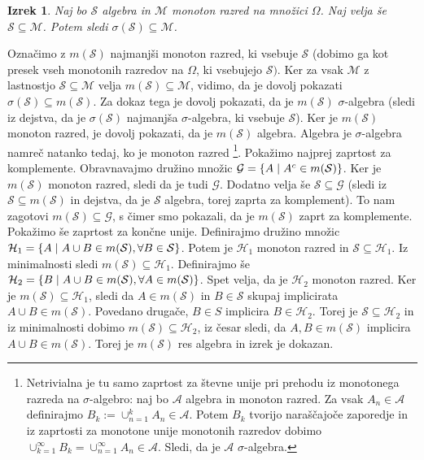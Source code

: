 \documentclass[12pt,a4paper]{amsart}
\theoremstyle{definition} %
\theoremstyle{plain} %
\newtheorem{izrek}[definicija]{Izrek}
\begin{document}
\begin{izrek} Naj bo $\mathcal{S}$ algebra in $\mathcal{M}$ monoton razred na množici $\Omega$. Naj velja še $\mathcal{S} \subseteq \mathcal{M}$. Potem sledi $\sigma{(\mathcal{S})} \subseteq \mathcal{M}$.
\end{izrek}
\proof
 Označimo z $m(\mathcal{S})$ najmanjši monoton razred, ki vsebuje $\mathcal{S}$ (dobimo ga kot presek vseh monotonih razredov na $\Omega$, ki vsebujejo $\mathcal{S}).$ Ker za vsak $\mathcal{M}$ z lastnostjo $\mathcal{S} \subseteq \mathcal{M}$ velja $m(\mathcal{S}) \subseteq \mathcal{M}$, vidimo, da je dovolj pokazati $\sigma(\mathcal{S}) \subseteq m(\mathcal{S})$. Za dokaz tega je dovolj pokazati, da je $m(\mathcal{S}) $ $\sigma$-algebra (sledi iz dejstva, da je $\sigma(\mathcal{S})$ najmanjša $\sigma$-algebra, ki vsebuje $\mathcal{S}$). Ker je $m(\mathcal{S})$ monoton razred, je dovolj pokazati, da je $m(\mathcal{S})$ algebra. Algebra je $\sigma$-algebra namreč natanko tedaj, ko je monoton razred \footnote{Netrivialna je tu samo zaprtost za števne unije pri prehodu iz monotonega razreda na $\sigma$-algebro: naj bo $\mathcal{A}$ algebra in monoton razred. Za vsak $A_n \in \mathcal{A}$ definirajmo $B_k:=\cup_{n=1}^k A_n \in \mathcal{A}$. Potem $B_k$ tvorijo naraščajoče zaporedje in iz zaprtosti za monotone unije monotonih razredov dobimo $\cup_{k=1}^\infty B_k=\cup_{n=1}^\infty A_n \in \mathcal{A}$. Sledi, da je $\mathcal{A}$ $\sigma$-algebra.}.
\newline
Pokažimo najprej zaprtost za komplemente. Obravnavajmo družino množic $\mathcal{G} = \{ A\hspace{0.1cm}|\hspace{0.1cm} A^c \in m(\mathcal{S})\}$.  Ker je $m(\mathcal{S})$ monoton razred, sledi da je tudi $\mathcal{G}$. Dodatno velja še $\mathcal{S} \subseteq \mathcal{G}$ (sledi iz $\mathcal{S} \subseteq m(\mathcal{S})$ in dejstva, da je $\mathcal{S}$ algebra, torej zaprta za komplement). To nam zagotovi $m(\mathcal{S}) \subseteq \mathcal{G}$, s čimer smo pokazali, da je $m(\mathcal{S})$ zaprt za komplemente.
\newline
Pokažimo še zaprtost za končne unije. Definirajmo družino množic $\mathcal{H}_1 = \{ A\hspace{0.1cm}|\hspace{0.1cm} A \cup B \in m(\mathcal{S}), \forall B \in \mathcal{S}\}$. Potem je $\mathcal{H}_1$ monoton razred in $\mathcal{S} \subseteq \mathcal{H}_1$. Iz minimalnosti sledi $m(\mathcal{S}) \subseteq \mathcal{H}_1$. Definirajmo še  $\mathcal{H}_2 = \{ B\hspace{0.1cm}|\hspace{0.1cm} A \cup B \in m(\mathcal{S}), \forall A \in m(\mathcal{S})\}$. Spet velja, da je $\mathcal{H}_2$ monoton razred. Ker je $m(\mathcal{S}) \subseteq \mathcal{H}_1$, sledi da $A \in m(\mathcal{S})$ in $B \in \mathcal{S}$ skupaj implicirata $A \cup B \in m(\mathcal{S})$. Povedano drugače, $B \in S$ implicira $B \in \mathcal{H}_2$. Torej je $\mathcal{S} \subseteq \mathcal{H}_2$  in iz minimalnosti dobimo $m(\mathcal{S}) \subseteq \mathcal{H}_2$, iz česar sledi, da $A,B \in m(\mathcal{S})$ implicira $A \cup B \in m(\mathcal{S})$. Torej je $m(\mathcal{S})$ res algebra in izrek je dokazan.
\end{document}
